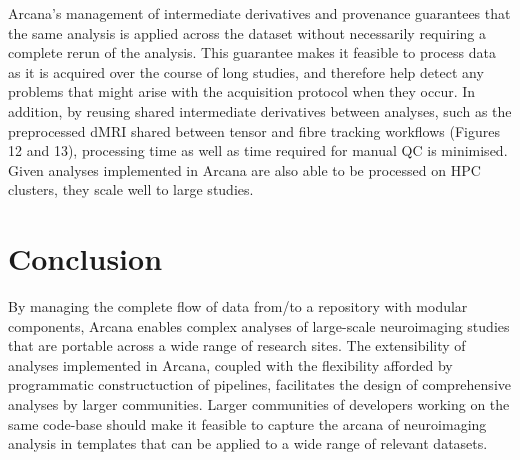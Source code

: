 Arcana's management of intermediate derivatives and provenance
guarantees that the same analysis is applied across the dataset without
necessarily requiring a complete rerun of the analysis. This guarantee
makes it feasible to process data as it is acquired over the course of
long studies, and therefore help detect any problems that might arise
with the acquisition protocol when they occur. In addition, by reusing
shared intermediate derivatives between analyses, such as the
preprocessed dMRI shared between tensor and fibre tracking workflows
(Figures 12 and 13), processing time as well as time required for manual
QC is minimised. Given analyses implemented in Arcana are also able to
be processed on HPC clusters, they scale well to large studies.

\section{Conclusion}
\label{conclusion}

By managing the complete flow of data from/to a repository with modular
components, Arcana enables complex analyses of large-scale neuroimaging
studies that are portable across a wide range of research sites. The
extensibility of analyses implemented in Arcana, coupled with the
flexibility afforded by programmatic constructuction of pipelines,
facilitates the design of comprehensive analyses by larger communities.
Larger communities of developers working on the same code-base should
make it feasible to capture the arcana of neuroimaging analysis in
templates that can be applied to a wide range of relevant datasets.



